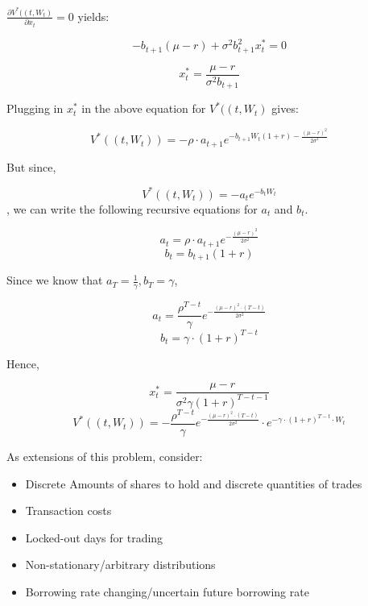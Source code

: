 \documentclass[12pt]{amsart}
\begin{document}
$\frac {\partial V^*((t, W_t)} {\partial x_t} = 0$ yields:

$$-b_{t+1} (\mu - r) + \sigma^2 b_{t+1}^2 x^*_t = 0$$

$$x^*_t = \frac {\mu - r} {\sigma^2 b_{t+1}}$$

Plugging in $x^*_t$ in the above equation for $V^*((t, W_t)$ gives:

$$V^*((t, W_t)) = - \rho \cdot a_{t+1} e^{-b_{t+1} W_t (1 + r) - \frac {(\mu - r)^2} {2 \sigma^2}} $$

But since,

$$V^*((t, W_t)) = -a_t e^{-b_t W_t}$$, we can write the following recursive equations for $a_t$ and $b_t$.

$$a_t = \rho \cdot a_{t+1} e^{- \frac {(\mu -r)^2} {2 \sigma^2}}$$
$$b_t = b_{t+1} (1 + r)$$

Since we know that $a_T = \frac 1 \gamma, b_T = \gamma$,

$$a_t = \frac {\rho^{T-t}} {\gamma} e^{- \frac {(\mu - r)^2 \cdot (T-t)} {2 \sigma^2}}$$
$$b_t = \gamma \cdot (1+ r)^{T-t}$$

Hence,

$$x^*_t = \frac {\mu - r} {\sigma^2 \gamma (1+ r)^{T-t-1}}$$
$$V^*((t, W_t)) = - \frac {\rho^{T-t}} {\gamma} e^{- \frac {(\mu - r)^2 \cdot (T-t)} {2 \sigma^2}} \cdot e^{- \gamma \cdot (1+ r)^{T-t} \cdot W_t}$$

As extensions of this problem, consider:

\begin{itemize}
\item Discrete Amounts of shares to hold and discrete quantities of trades
\item Transaction costs
\item Locked-out days for trading
\item Non-stationary/arbitrary distributions
\item Borrowing rate changing/uncertain future borrowing rate
\end{itemize}
\end{document}
